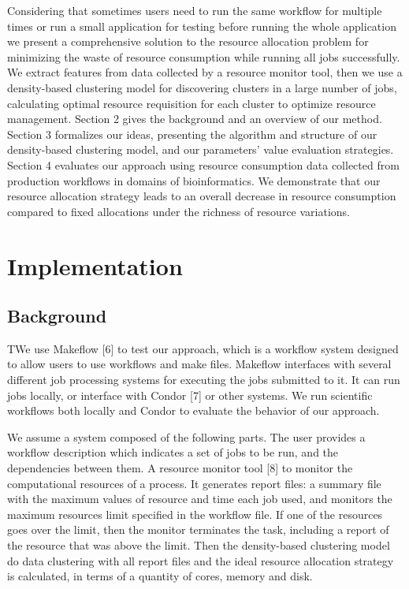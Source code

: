 \documentclass[conference]{IEEEtran}
\begin{document}
Considering that sometimes users need to run the same workflow for multiple times or run a small application for testing before running the whole application we present a comprehensive solution to the resource allocation problem for minimizing the waste of resource consumption while running all jobs successfully. We extract features from data collected by a resource monitor tool, then we use a density-based clustering model for discovering clusters in a large number of jobs, calculating optimal resource requisition for each cluster to optimize resource management. Section 2 gives the background and an overview of our method. Section 3 formalizes our ideas, presenting the algorithm and structure of our density-based clustering model, and our parameters' value evaluation strategies. Section 4 evaluates our approach using resource consumption data collected from production workflows in domains of bioinformatics. We demonstrate that our resource allocation strategy leads to an overall decrease in resource consumption compared to fixed allocations under the richness of resource variations.

\section{Implementation}

\subsection{Background}

TWe use Makeflow [6] to test our approach, which is a workflow system designed to allow users to use workflows and make files. Makeflow interfaces with several different job processing systems for executing the jobs submitted to it. It can run jobs locally, or interface with Condor [7] or other systems. We run scientific workflows both locally and Condor to evaluate the behavior of our approach.

We assume a system composed of the following parts. The user provides a workflow description which indicates a set of jobs to be run, and the dependencies between them. A resource monitor tool [8] to monitor the computational resources of a process. It generates report files: a summary file with the maximum values of resource and time each job used, and monitors the maximum resources limit specified in the workflow file. If one of the resources goes over the limit, then the monitor terminates the task, including a report of the resource that was above the limit. Then the density-based clustering model do data clustering with all report files and the ideal resource allocation strategy is calculated, in terms of a quantity of cores, memory and disk. 
\end{document}
